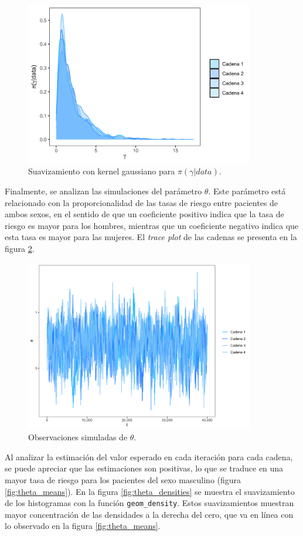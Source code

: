 \documentclass[11pt,a4paper]{article}
\begin{document}
\begin{figure}[!p]
\centering\includegraphics[width=10cm]{gamma_densities.png}
\caption{Suavizamiento con kernel gaussiano para $\pi (\gamma | data)$.}
\label{fig:gamma_densities}
\end{figure}

Finalmente, se analizan las simulaciones del parámetro $\theta$. Este parámetro está relacionado con la proporcionalidad de las tasas de riesgo entre pacientes de ambos sexos, en el sentido de que un coeficiente positivo indica que la tasa de riesgo es mayor para los hombres, mientras que un coeficiente negativo indica que esta tasa es mayor para las mujeres. El \textit{trace plot} de las cadenas se presenta en la figura \ref{fig:theta_trace}.\\

\begin{figure}[!p]
\centering\includegraphics[width=10cm]{theta_traceplot.png}
\caption{Observaciones simuladas de $\theta$.}
\label{fig:theta_trace}
\end{figure}

Al analizar la estimación del valor esperado en cada iteración para cada cadena, se puede apreciar que las estimaciones son positivas, lo que se traduce en una mayor tasa de riesgo para los pacientes del sexo masculino (figura \ref{fig:theta_means}). En la figura \ref{fig:theta_densities} se muestra el suavizamiento de los histogramas con la función \texttt{geom\_density}. Estos suavizamientos muestran mayor concentración de las densidades a la derecha del cero, que va en línea con lo observado en la figura \ref{fig:theta_means}.\\
\end{document}
